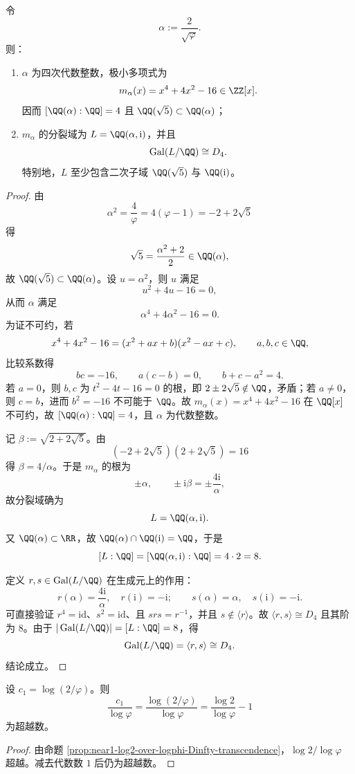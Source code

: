 \begin{theorem}\label{thm:near1-alpha-2-over-sqrtphi-galois-D4}
令
\[
\alpha:=\frac{2}{\sqrt\varphi}.
\]
则：
\begin{enumerate}
  \item \(\alpha\) 为四次代数整数，极小多项式为
  \[
  m_\alpha(x)=x^4+4x^2-16\in\ZZ[x].
  \]
  因而
  \(
  [\QQ(\alpha):\QQ]=4
  \)
  且
  \(
  \QQ(\sqrt5)\subset\QQ(\alpha)
  \)；
  \item \(m_\alpha\) 的分裂域为 \(L=\QQ(\alpha,\mathrm{i})\)，并且
  \[
  \operatorname{Gal}(L/\QQ)\cong D_4.
  \]
  特别地，\(L\) 至少包含二次子域 \(\QQ(\sqrt5)\) 与 \(\QQ(\mathrm{i})\)。
\end{enumerate}
\end{theorem}
\begin{proof}
由
\[
\alpha^2=\frac{4}{\varphi}=4(\varphi-1)=-2+2\sqrt5
\]
得
\[
\sqrt5=\frac{\alpha^2+2}{2}\in\QQ(\alpha),
\]
故 \(\QQ(\sqrt5)\subset\QQ(\alpha)\)。设 \(u=\alpha^2\)，则 \(u\) 满足
\[
u^2+4u-16=0,
\]
从而 \(\alpha\) 满足
\[
\alpha^4+4\alpha^2-16=0.
\]
为证不可约，若
\[
x^4+4x^2-16=(x^2+ax+b)(x^2-ax+c),\qquad a,b,c\in\QQ,
\]
比较系数得
\[
bc=-16,\qquad a(c-b)=0,\qquad b+c-a^2=4.
\]
若 \(a=0\)，则 \(b,c\) 为 \(t^2-4t-16=0\) 的根，即 \(2\pm 2\sqrt5\notin\QQ\)，矛盾；若 \(a\neq 0\)，则 \(c=b\)，进而 \(b^2=-16\) 不可能于 \(\QQ\)。故 \(m_\alpha(x)=x^4+4x^2-16\) 在 \(\QQ[x]\) 不可约，故 \([\QQ(\alpha):\QQ]=4\)，且 \(\alpha\) 为代数整数。

记 \(\beta:=\sqrt{2+2\sqrt5}\)。由
\[
(-2+2\sqrt5)(2+2\sqrt5)=16
\]
得 \(\beta=4/\alpha\)。于是 \(m_\alpha\) 的根为
\[
\pm\alpha,\qquad \pm \mathrm{i}\beta=\pm\frac{4\mathrm{i}}{\alpha},
\]
故分裂域确为
\[
L=\QQ(\alpha,\mathrm{i}).
\]
又 \(\QQ(\alpha)\subset\RR\)，故 \(\QQ(\alpha)\cap\QQ(\mathrm{i})=\QQ\)，于是
\[
[L:\QQ]=[\QQ(\alpha,\mathrm{i}):\QQ]=4\cdot 2=8.
\]

定义 \(r,s\in\operatorname{Gal}(L/\QQ)\) 在生成元上的作用：
\[
r(\alpha)=\frac{4\mathrm{i}}{\alpha},\quad r(\mathrm{i})=-\mathrm{i};
\qquad
s(\alpha)=\alpha,\quad s(\mathrm{i})=-\mathrm{i}.
\]
可直接验证 \(r^4=\mathrm{id}\)、\(s^2=\mathrm{id}\)、且 \(srs=r^{-1}\)，并且 \(s\notin\langle r\rangle\)。故 \(\langle r,s\rangle\cong D_4\) 且其阶为 \(8\)。由于 \(|\operatorname{Gal}(L/\QQ)|=[L:\QQ]=8\)，得
\[
\operatorname{Gal}(L/\QQ)=\langle r,s\rangle\cong D_4.
\]
结论成立。
\end{proof}

\begin{corollary}[归一化漂移指数的超越性]\label{cor:near1-normalized-c1-over-logphi-transcendence}
设 \(c_1=\log(2/\varphi)\)。则
\[
\frac{c_1}{\log\varphi}
=\frac{\log(2/\varphi)}{\log\varphi}
=\frac{\log2}{\log\varphi}-1
\]
为超越数。
\end{corollary}
\begin{proof}
由命题 \ref{prop:near1-log2-over-logphi-Dinfty-transcendence}，\(\log2/\log\varphi\) 超越。减去代数数 \(1\) 后仍为超越数。
\end{proof}

